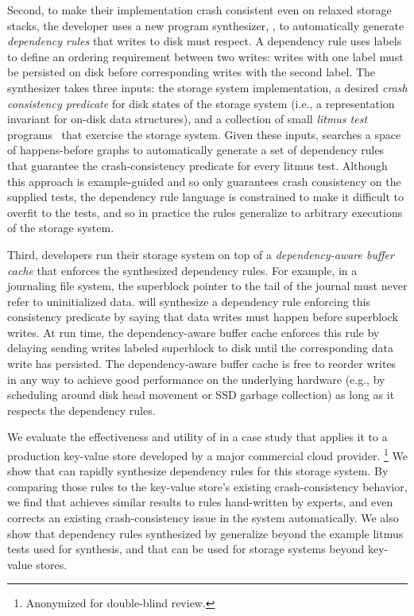 Second, to make their implementation crash consistent even on relaxed storage stacks,
the developer uses a new program synthesizer, \depsynth,
to automatically generate \emph{dependency rules} that writes to disk must respect.
A dependency rule uses labels to define an ordering requirement between two writes:
writes with one label must be persisted on disk before corresponding writes with the second label.
The \depsynth synthesizer takes three inputs: the storage system implementation,
a desired \emph{crash consistency predicate} for disk states of the storage system
(i.e., a representation invariant for on-disk data structures),
and a collection of small \emph{litmus test} programs~\cite{alglave:litmus-tool,bornholt:ferrite}
that exercise the storage system.
Given these inputs, \depsynth searches a space of happens-before graphs
to automatically generate a set of dependency rules
that guarantee the crash-consistency predicate for every litmus test.
Although this approach is example-guided and so only guarantees crash consistency on the supplied tests,
the dependency rule language is constrained to make it difficult to overfit to the tests,
and so in practice the rules generalize to arbitrary executions of the storage system.

Third, developers run 
their storage system on top of a \emph{dependency-aware buffer cache}
that enforces the synthesized dependency rules.
For example, in a journaling file system,
the superblock pointer to the tail of the journal must never refer to uninitialized data.
\depsynth will synthesize a dependency rule enforcing this consistency predicate
by saying that data writes must happen before superblock writes.
At run time, the dependency-aware buffer cache
enforces this rule by delaying sending writes labeled \textsf{superblock}
to disk until the corresponding \textsf{data} write has persisted.
The dependency-aware buffer cache is free to reorder writes in any way
to achieve good performance on the underlying hardware
(e.g., by scheduling around disk head movement or SSD garbage collection)
as long as it respects the dependency rules.

We evaluate the effectiveness and utility of \depsynth
in a case study that applies it to a production key-value store
developed by a major commercial cloud provider.%
\footnote{Anonymized for double-blind review.}
We show that \depsynth can rapidly synthesize dependency rules for this storage system.
By comparing those rules to the key-value store's existing crash-consistency behavior,
we find that \depsynth achieves similar results to rules hand-written by experts,
and even corrects an existing crash-consistency issue in the system automatically.
We also show that dependency rules synthesized by \depsynth
generalize beyond the example litmus tests used for synthesis,
and that \depsynth can be used for storage systems beyond key-value stores.

